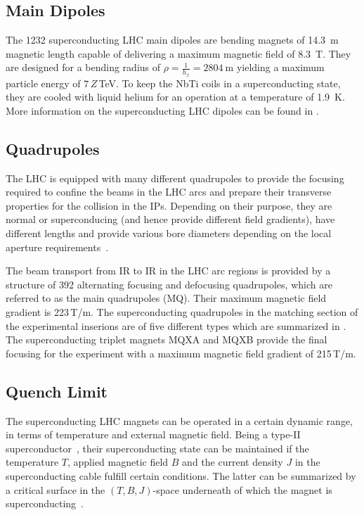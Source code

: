 \subsection{Main Dipoles}

The 1232 superconducting LHC main dipoles are bending magnets of 14.3~m magnetic length capable of delivering a maximum magnetic field of 8.3~T. They are designed for a bending radius of $\rho=\frac{1}{h_x} = 2804~\text{m}$ yielding a maximum particle energy of $7\,Z\,$TeV. To keep the NbTi coils in a superconducting state, they are cooled with liquid helium for an operation at a temperature of 1.9~K. More information on the superconducting LHC dipoles can be found in \citedr.
%
\subsection{Quadrupoles}
The LHC is equipped with many different quadrupoles to provide the focusing required to confine the beams in the LHC arcs and prepare their transverse properties for the collision in the IPs. Depending on their purpose, they are normal or superconducing (and hence provide different field gradients), have different lengths and provide various bore diameters depending on the local aperture requirements~\citedr. 

The beam transport from IR to IR in the LHC arc regions is provided by a structure of 392 alternating focusing and defocusing quadrupoles, which are referred to as the main quadrupoles (MQ). Their maximum magnetic field gradient is 223\,T/m. The superconducting quadrupoles in the matching section of the experimental inserions are of five different types which are summarized in \citedr. The superconducting triplet magnets MQXA and MQXB provide the final focusing for the experiment with a maximum magnetic field gradient of 215\,T/m. 


\subsection{Quench Limit} \label{chap:quenchlim}

The superconducting LHC magnets can be operated in a certain dynamic range, in terms of temperature and external magnetic field. Being a type-II superconductor~\cite{tinkham1996introduction}, their superconducting state can be maintained if the temperature $T$, applied magnetic field $B$ and the current density $J$ in the superconducting cable fulfill certain conditions. The latter can be summarized by a critical surface in the $(T,B,J)$-space underneath of which the magnet is superconducting~\cite{iwasa09}. 

